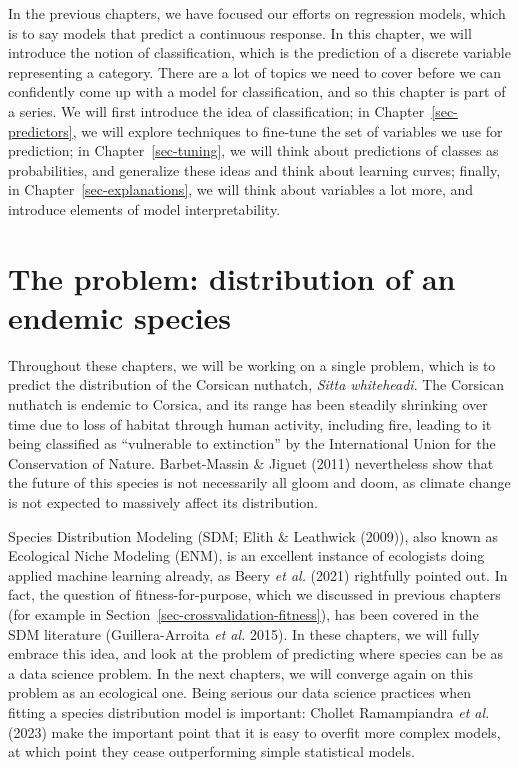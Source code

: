 \documentclass[
  letterpaper,
]{scrbook}
\begin{document}
In the previous chapters, we have focused our efforts on regression
models, which is to say models that predict a continuous response. In
this chapter, we will introduce the notion of classification, which is
the prediction of a discrete variable representing a category. There are
a lot of topics we need to cover before we can confidently come up with
a model for classification, and so this chapter is part of a series. We
will first introduce the idea of classification; in
Chapter~\ref{sec-predictors}, we will explore techniques to fine-tune
the set of variables we use for prediction; in Chapter~\ref{sec-tuning},
we will think about predictions of classes as probabilities, and
generalize these ideas and think about learning curves; finally, in
Chapter~\ref{sec-explanations}, we will think about variables a lot
more, and introduce elements of model interpretability.

\section{The problem: distribution of an endemic
species}\label{the-problem-distribution-of-an-endemic-species}

Throughout these chapters, we will be working on a single problem, which
is to predict the distribution of the Corsican nuthatch, \emph{Sitta
whiteheadi}. The Corsican nuthatch is endemic to Corsica, and its range
has been steadily shrinking over time due to loss of habitat through
human activity, including fire, leading to it being classified as
``vulnerable to extinction'' by the International Union for the
Conservation of Nature. Barbet-Massin \& Jiguet (2011) nevertheless show
that the future of this species is not necessarily all gloom and doom,
as climate change is not expected to massively affect its distribution.

Species Distribution Modeling (SDM; Elith \& Leathwick (2009)), also
known as Ecological Niche Modeling (ENM), is an excellent instance of
ecologists doing applied machine learning already, as Beery \emph{et
al.} (2021) rightfully pointed out. In fact, the question of
fitness-for-purpose, which we discussed in previous chapters (for
example in Section~\ref{sec-crossvalidation-fitness}), has been covered
in the SDM literature (Guillera-Arroita \emph{et al.} 2015). In these
chapters, we will fully embrace this idea, and look at the problem of
predicting where species can be as a data science problem. In the next
chapters, we will converge again on this problem as an ecological one.
Being serious our data science practices when fitting a species
distribution model is important: Chollet Ramampiandra \emph{et al.}
(2023) make the important point that it is easy to overfit more complex
models, at which point they cease outperforming simple statistical
models.
\end{document}
